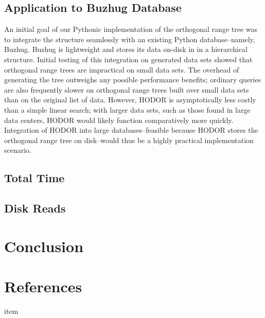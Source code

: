 \documentclass[11pt, oneside]{article}
\begin{document}
\subsection{Application to Buzhug Database}

An initial goal of our Pythonic implementation of the orthogonal range tree was to integrate the structure seamlessly with an existing Python database--namely, Buzhug. Buzhug is lightweight and stores its data on-disk in in a hierarchical structure. Initial testing of this integration on generated data sets showed that orthogonal range trees are impractical on small data sets. The overhead of generating the tree outweighs any possible performance benefits; ordinary queries are also frequently slower on orthogonal range trees built over small data sets than on the original list of data. However, HODOR is asymptotically less costly than a simple linear search; with larger data sets, such as those found in large data centers, HODOR would likely function comparatively more quickly. Integration of HODOR into large databases--feasible because HODOR stores the orthogonal range tree on disk--would thus be a highly practical implementation scenario.



\subsection{Total Time}

\subsection{Disk Reads}

\section{Conclusion}


\section{References}

\noindent

\begin{description}

\item item

\end{description}
\end{document}

